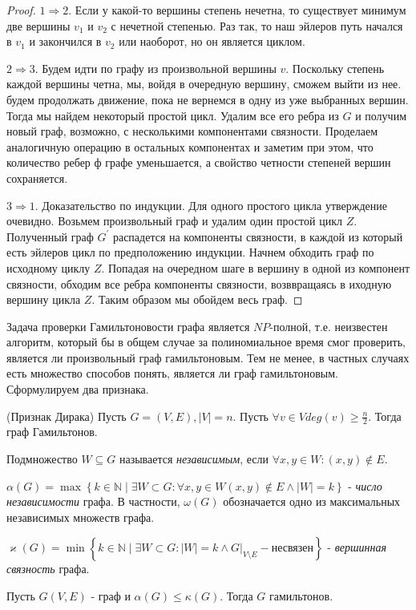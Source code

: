 \begin{proof}
	$1 \Rightarrow 2$.
	Если у какой-то вершины степень нечетна, то существует минимум две вершины $v_1$ и $v_2$ с нечетной степенью. Раз так, то наш эйлеров путь начался в $v_1$ и закончился в $v_2$ или наоборот, но он является циклом.
	 
	$2 \Rightarrow 3$.
	Будем идти по графу из произвольной вершины $v$. Поскольку степень каждой вершины четна, мы, войдя в очередную вершину, сможем выйти из нее. будем продолжать движение, пока не вернемся в одну из уже выбранных вершин. Тогда мы найдем некоторый простой цикл.
	Удалим все его ребра из $G$ и получим новый граф, возможно, с несколькими компонентами связности.
	Проделаем аналогичную операцию в остальных компонентах и заметим при этом, что количество ребер ф графе уменьшается, а свойство четности степеней вершин сохраняется.
	
	$3 \Rightarrow 1$.
	Доказательство по индукции. Для одного простого цикла утверждение очевидно.
	Возьмем произвольный граф и удалим один простой цикл $Z$. Полученный граф $G^{\prime}$ распадется на компоненты связности, в каждой из который есть эйлеров цикл по предположению индукции. Начнем обходить граф по исходному циклу $Z$. Попадая на очередном шаге в вершину в одной из компонент связности, обходим все ребра компоненты связности, возввращаясь в иходную вершину цикла $Z$. Таким образом мы обойдем весь граф.
\end{proof}

Задача проверки Гамильтоновости графа является $NP$-полной, т.е. неизвестен алгоритм, который бы в общем случае за полиномиальное время смог проверить, является ли произвольный граф гамильтоновым.
Тем не менее, в частных случаях есть множество способов понять, является ли граф гамильтоновым. 
Сформулируем два признака.

\begin{theorem}(Признак Дирака)
	Пусть $G = (V, E), |V| = n$. Пусть $\forall v \in V deg(v) \geqslant \frac{n}{2}$. Тогда граф Гамильтонов.
\end{theorem}

\begin{Def}
	Подмножество $W \subseteq G$ называется \emph{независимым}, если $\forall x, y \in W : (x, y) \notin E$. 
\end{Def}

\begin{Def}
	$\alpha(G) = \max \left\lbrace k \in \mathbb{N} \mid \exists W \subset G : \forall x, y \in W  (x, y) \notin E \land |W| = k  \right\rbrace$ - \emph{число независимости} графа. В частности, $\omega(G)$ обозначается одно из максимальных независимых множеств графа.
\end{Def}

\begin{Def}
	$\varkappa(G) = \min \left\lbrace k \in \mathbb{N} \mid \exists W \subset G : |W| = k \land G|_{V\setminus E} - \text{несвязен} \right\rbrace$ - \emph{вершинная связность} графа. 
\end{Def}

\begin{theorem}
	Пусть $G(V, E)$ - граф и $\alpha(G) \leqslant \kappa(G)$. Тогда $G$ гамильтонов.
\end{theorem}
